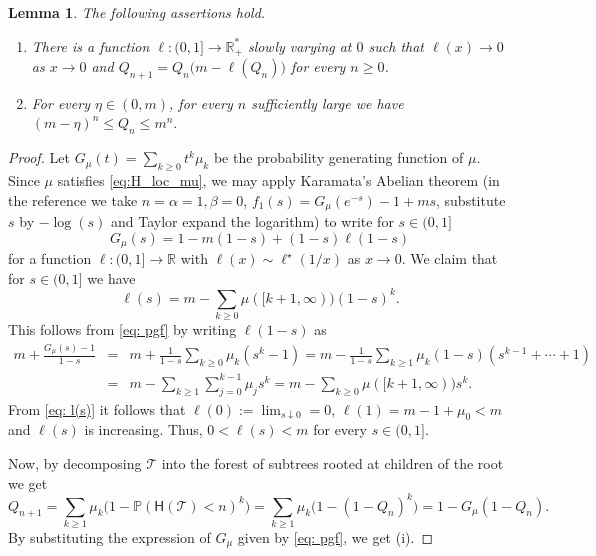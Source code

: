 \documentclass[a4paper,11pt]{article}
\DeclareRobustCommand{\P}{\mathbb{P}}
\DeclareRobustCommand{\R}{\mathbb{R}}
\newtheorem{lemma}[theorem]{Lemma}
\begin{document}
\begin{lemma}
\label{lem:bounds} The following assertions hold.
\begin{enumerate}
\item[(i)] There is a   function $\ell : (0,1] \rightarrow \R_{+}^{*}$ slowly varying at $0$ such that $\ell(x) \rightarrow 0$ as $x \rightarrow 0$ and $Q_{n+1} = Q_n\big(m-\ell(Q_n)\big)$ for every  $n \geq 0$.
\item[(ii)] For every $\eta \in (0,m)$, for every $n$ sufficiently large  we have $(m-\eta)^{n} \leq Q_{n} \leq m^{n}.$
\end{enumerate}
\end{lemma} 
\begin{proof}
 Let $G_\mu (t) = \sum_{k\geq 0}t^k \mu_k$ be the probability generating function of $\mu$. Since $\mu$ satisfies \eqref{eq:H_loc_mu}, we may apply Karamata's Abelian theorem \cite[Theorem 8.1.6]{Bingham_Goldie_Teugels_1987} (in the reference we take $n= \alpha = 1, \beta = 0$, $f_1(s) = G_\mu(e^{-s})-1+ms$, substitute $s$ by $-\log(s)$ and Taylor expand the logarithm) to write for $s \in (0,1]$
            \begin{equation}\label{eq: pgf}
                G_\mu(s) = 1- m(1-s) + (1-s) \ell(1-s)
            \end{equation}
            for a  function $\ell : (0,1] \rightarrow \R$ with $\ell(x) \sim \ell^\star(1/x)$ as $x \rightarrow 0$. We claim that for $s \in (0,1]$ we have
\begin{equation}\label{eq: l(s)}
                \ell(s) = m-\sum_{k\geq 0} \mu([k+1,\infty))(1-s)^k.
            \end{equation}
            This follows from \eqref{eq: pgf} by  writing $\ell(1-s)$ as
            \begin{eqnarray*}
                m + \frac{G_\mu(s)-1}{1-s} &=& m + \frac{1}{1-s} \sum_{k\geq 0} \mu_k (s^k-1) 
                  = m- \frac{1}{1-s} \sum_{k\geq 1}\mu_k (1-s)(s^{k-1}+ \cdots +1) \\
                & =& m-\sum_{k\geq 1} \sum_{j=0}^{k-1} \mu_j s^k=  m-\sum_{k\geq 0} \mu([k+1,\infty))s^k.
            \end{eqnarray*}
            From \eqref{eq: l(s)} it follows that $\ell(0):= \lim_{s \downarrow 0} = 0$, $\ell(1) = m-1+\mu_0 <m$ and $\ell(s)$ is increasing. Thus, $0<\ell(s)<m$ for every $s \in (0,1]$.
           
            Now,  by decomposing $ \mathcal{T}$ into the forest of subtrees rooted at children of the root we get
            \begin{equation*}
                Q_{n+1} = \sum_{k \geq 1} \mu_k \Big(1-\P(\mathsf{H}(\mathcal{T})< n)^k\Big) = \sum_{k\geq 1}\mu_k\Big(1-(1-Q_n)^k\Big) = 1-G_\mu(1-Q_n).
            \end{equation*}
            By substituting the expression of $G_{\mu}$ given by \eqref{eq: pgf}, we get (i).
            

\end{proof}
\end{document}
